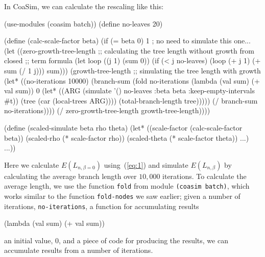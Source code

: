 \documentclass{manual}
\begin{document}
In CoaSim, we can calculate the rescaling like this:
\begin{code}
(use-modules (coasim batch))
(define no-leaves    20)

(define (calc-scale-factor beta)
  (if (= beta 0) 1 ; no need to simulate this one...
      (let ((zero-growth-tree-length
             ;; calculating the tree length without growth from closed
             ;; term formula
             (let loop ((j 1) (sum 0))
               (if (< j no-leaves)
                   (loop (+ j 1) (+ sum (/ 1 j)))
                   sum)))
            (growth-tree-length
             ;; simulating the tree length with growth
             (let* ((no-iterations 10000)
                    (branch-sum
                     (fold no-iterations (lambda (val sum) (+ val sum)) 0
                           (let* ((ARG (simulate '() no-leaves :beta beta
                                                 :keep-empty-intervals #t))
                                  (tree (car (local-trees ARG))))
                             (total-branch-length tree)))))
               (/ branch-sum no-iterations))))
        (/ zero-growth-tree-length growth-tree-length))))

(define (scaled-simulate beta rho theta)
  (let* ((scale-factor   (calc-scale-factor beta))
         (scaled-rho     (* scale-factor rho))
         (scaled-theta   (* scale-factor theta))
         ...)
    ...))
\end{code}
Here we calculate $E(L_{n,\beta=0})$ using~(\ref{eq:1}) and simulate
$E(L_{n,\beta})$ by calculating the average branch length over
$10,000$ iterations.  To calculate the average length, we use the
function \texttt{fold} from module \texttt{(coasim batch)}, which
works similar to the function \texttt{fold-nodes} we saw earlier;
given a number of iterations, \texttt{no-iterations}, a function for
accumulating results 
\begin{code}
  (lambda (val sum) (+ val sum))
\end{code}
an initial value, $0$, and a piece of code for producing the results,
we can accumulate results from a number of iterations.
\end{document}
